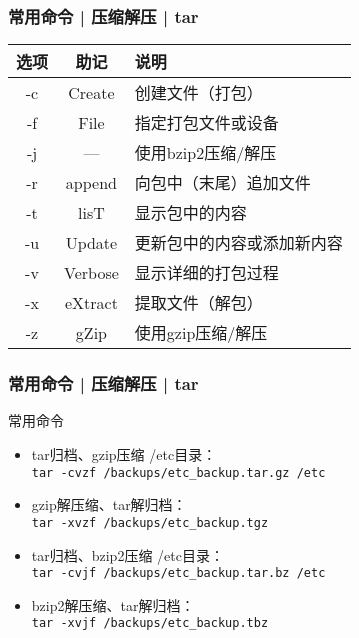 \begin{frame}
  \frametitle{常用命令 | 压缩解压 | \alert{tar}}
  \begin{table}
    \centering
    \begin{tabularx}{0.9\textwidth}{ccX}
      \hline
      \rowcolor{blue!50}选项 & 助记 & 说明\\
      \hline
      -c & Create & 创建文件（打包）\\
      -f & File & 指定打包文件或设备\\
      -j & --- & 使用bzip2压缩/解压\\
      -r & append & 向包中（末尾）追加文件\\
      -t & lisT & 显示包中的内容\\
      -u & Update & 更新包中的内容或添加新内容\\
      -v & Verbose & 显示详细的打包过程\\
      -x & eXtract & 提取文件（解包）\\
      -z & gZip & 使用gzip压缩/解压\\
      \hline
    \end{tabularx}
  \end{table}
\end{frame}

\begin{frame}[fragile]
  \frametitle{常用命令 | 压缩解压 | \alert{tar}}
  \begin{block}{常用命令}
    \begin{itemize}
      \item tar归档、gzip压缩 /etc目录：\\ \verb|tar -cvzf /backups/etc_backup.tar.gz /etc|
      \item gzip解压缩、tar解归档：\\ \verb|tar -xvzf /backups/etc_backup.tgz|
      \item tar归档、bzip2压缩 /etc目录：\\ \verb|tar -cvjf /backups/etc_backup.tar.bz /etc|
      \item bzip2解压缩、tar解归档：\\ \verb|tar -xvjf /backups/etc_backup.tbz|
    \end{itemize}
  \end{block}
\end{frame}

